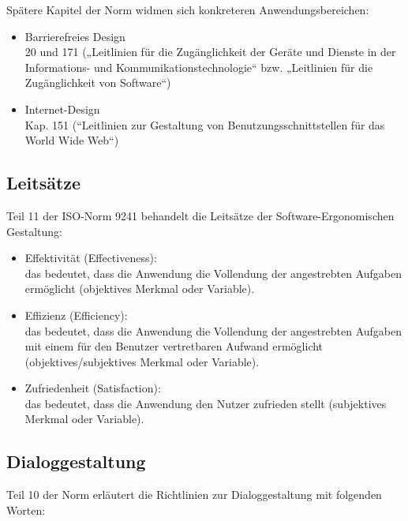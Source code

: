 Spätere  Kapitel der Norm widmen sich konkreteren Anwendungsbereichen:
\begin{itemize}
\item Barrierefreies Design\\
20 und 171 („Leitlinien für die Zugänglichkeit der Geräte und Dienste in der Informations- und Kommunikationstechnologie“ bzw. „Leitlinien für die Zugänglichkeit von Software“)
\item Internet-Design\\
Kap. 151 (“Leitlinien zur Gestaltung von Benutzungsschnittstellen für das World Wide Web“)
\end{itemize}

\subsection{Leitsätze}
Teil 11 der ISO-Norm 9241 behandelt die Leitsätze der Software-Ergonomischen Gestaltung:

\begin{itemize}
\item Effektivität (Effectiveness): \\
das bedeutet, dass die Anwendung die Vollendung der angestrebten Aufgaben ermöglicht (objektives Merkmal oder Variable).
\item Effizienz (Efficiency): \\
das bedeutet, dass die Anwendung die Vollendung der angestrebten Aufgaben mit einem für den Benutzer vertretbaren Aufwand ermöglicht (objektives/subjektives Merkmal oder Variable).
\item Zufriedenheit (Satisfaction): \\
das bedeutet, dass die Anwendung den Nutzer zufrieden stellt (subjektives Merkmal oder Variable).
\end{itemize}

\subsection{Dialoggestaltung}
Teil 10 der Norm erläutert die Richtlinien zur Dialoggestaltung mit folgenden Worten:

